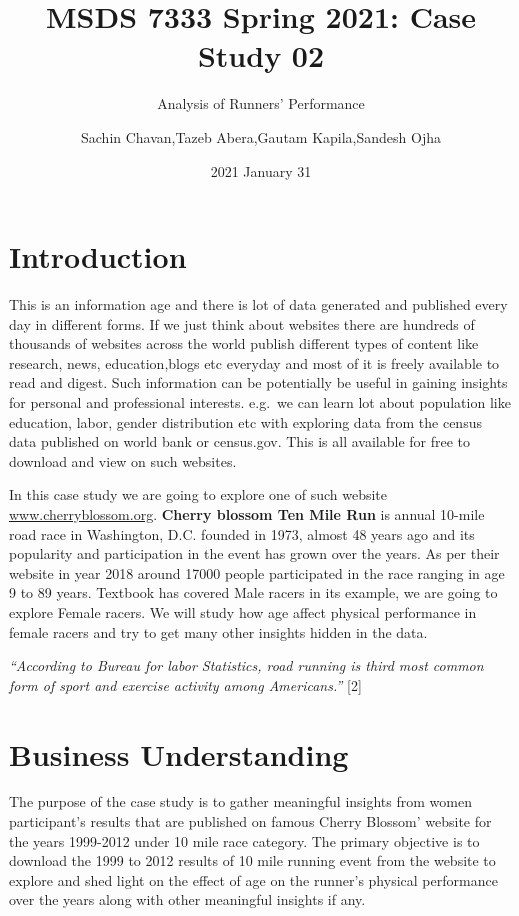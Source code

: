 \documentclass[
]{article}
\title{MSDS 7333 Spring 2021: Case Study 02}
\subtitle{Analysis of Runners' Performance}
\author{Sachin Chavan,Tazeb Abera,Gautam Kapila,Sandesh Ojha}
\date{2021 January 31}
\begin{document}
\maketitle

\hypertarget{introduction}{%
\section{Introduction}\label{introduction}}

This is an information age and there is lot of data generated and
published every day in different forms. If we just think about websites
there are hundreds of thousands of websites across the world publish
different types of content like research, news, education,blogs etc
everyday and most of it is freely available to read and digest. Such
information can be potentially be useful in gaining insights for
personal and professional interests. e.g.~we can learn lot about
population like education, labor, gender distribution etc with exploring
data from the census data published on world bank or census.gov. This is
all available for free to download and view on such websites.

In this case study we are going to explore one of such website
\href{http://www.cherryblossom.org/}{www.cherryblossom.org}.
\textbf{Cherry blossom Ten Mile Run} is annual 10-mile road race in
Washington, D.C. founded in 1973, almost 48 years ago and its popularity
and participation in the event has grown over the years. As per their
website in year 2018 around 17000 people participated in the race
ranging in age 9 to 89 years. Textbook has covered Male racers in its
example, we are going to explore Female racers. We will study how age
affect physical performance in female racers and try to get many other
insights hidden in the data.

\emph{``According to Bureau for labor Statistics, road running is third
most common form of sport and exercise activity among Americans.''}
{[}2{]}

\hypertarget{business-understanding}{%
\section{Business Understanding}\label{business-understanding}}

The purpose of the case study is to gather meaningful insights from
women participant's results that are published on famous Cherry Blossom'
website for the years 1999-2012 under 10 mile race category. The primary
objective is to download the 1999 to 2012 results of 10 mile running
event from the website to explore and shed light on the effect of age on
the runner's physical performance over the years along with other
meaningful insights if any.
\end{document}
